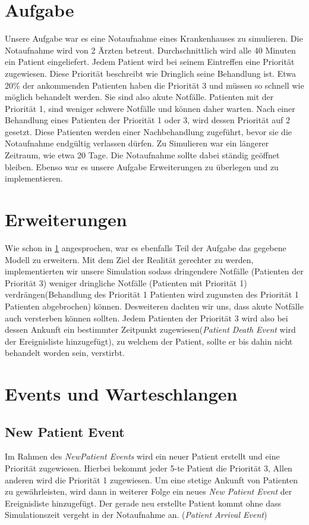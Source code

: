 \documentclass[12pt,fleqn,a4paper]{article}
\begin{document}
\section{Aufgabe}\label{sec:Aufgabe}
Unsere Aufgabe war es eine Notaufnahme eines Krankenhauses zu simulieren. Die Notaufnahme wird von 2 \"{A}rzten betreut. Durchschnittlich wird alle 40 Minuten ein Patient eingeliefert. Jedem Patient wird bei seinem Eintreffen eine Priorit\"{a}t zugewiesen.
Diese Priorit\"{a}t beschreibt wie Dringlich seine Behandlung ist.
Etwa 20\% der ankommenden Patienten haben die Priorit\"{a}t 3 und m\"{u}ssen so schnell wie m\"{o}glich behandelt werden. Sie sind also akute Notf\"{a}lle. Patienten mit der Priorit\"{a}t 1, sind weniger schwere Notf\"{a}lle und k\"{o}nnen daher warten. Nach einer Behandlung eines Patienten der Priorit\"{a}t 1 oder 3, wird dessen Priorit\"{a}t auf 2 gesetzt. Diese Patienten werden einer Nachbehandlung zugef\"{u}hrt, bevor sie die Notaufnahme endg\"{u}ltig verlassen d\"{u}rfen.
Zu Simulieren war ein l\"{a}ngerer Zeitraum, wie etwa 20 Tage. Die Notaufnahme sollte dabei st\"{a}ndig ge\"{o}ffnet bleiben.
Ebenso war es unsere Aufgabe Erweiterungen zu \"{u}berlegen und zu implementieren.

\section{Erweiterungen}
Wie schon in \ref{sec:Aufgabe} angesprochen, war es ebenfalls Teil der Aufgabe das gegebene Modell zu erweitern.
Mit dem Ziel der Realit\"{a}t gerechter zu werden, implementierten wir unsere Simulation sodass dringendere Notf\"{a}lle (Patienten der Priorit\"{a}t 3) weniger dringliche Notf\"{a}lle (Patienten mit Priorit\"{a}t 1) verdr\"{a}ngen(Behandlung des Priorit\"{a}t 1 Patienten wird zugunsten des Priorit\"{a}t 1 Patienten abgebrochen) k\"{o}nnen. 
Desweiteren dachten wir uns, dass akute Notf\"{a}lle auch versterben k\"{o}nnen sollten. Jedem Patienten der Priorit\"{a}t 3 wird also bei dessen Ankunft ein bestimmter Zeitpunkt zugewiesen(\textit{Patient Death Event} wird der Ereignisliste hinzugef\"{u}gt), zu welchem der Patient, sollte er bis dahin nicht behandelt worden sein, verstirbt.
\newpage

\section{Events und Warteschlangen}

\subsection{New Patient Event}
Im Rahmen des \textit{NewPatient Events} wird ein neuer Patient erstellt und eine Priorit\"{a}t zugewiesen.
Hierbei bekommt jeder 5-te Patient die Priorit\"{a}t 3,
Allen anderen wird die Priorit\"{a}t 1 zugewiesen. Um eine stetige Ankunft von Patienten zu gew\"{a}hrleisten, wird dann in weiterer Folge ein neues \textit{New Patient Event} der Ereignisliste hinzugef\"{u}gt. Der gerade neu erstellte Patient kommt ohne dass Simulationszeit vergeht in der Notaufnahme an. (\textit{Patient Arrival Event})
\end{document}
